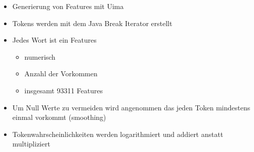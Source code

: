 \begin{frame}[c]
	\begin{itemize}
	  \item Generierung von Features mit Uima
	  \item Tokens werden mit dem Java Break Iterator erstellt
	  \item Jedes Wort ist ein Features
	  \begin{itemize}
	  	\item numerisch
	  	\item Anzahl der Vorkommen
	  	\item insgesamt 93311 Features
	  \end{itemize}  
	  \item Um Null Werte zu vermeiden wird angenommen das jeden Token mindestens einmal vorkommt (smoothing)
	  \item Tokenwahrscheinlichkeiten werden logarithmiert und addiert anstatt multipliziert
	\end{itemize}
\end{frame}